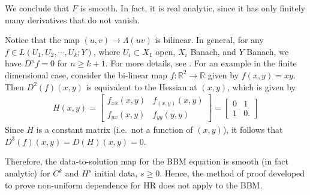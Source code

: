 \documentclass[12pt,reqno]{amsart}
\numberwithin{equation}{section}  %
\newcommand{\rr}{\mathbb{R}}
\begin{document}
We conclude that $F$ is smooth. In fact, it is real analytic, since it has only
finitely many derivatives that do not vanish. 
%
%
\begin{framed}
    Notice that the map $(u, v) \to \Lambda (uv)$ is bilinear. In general, for
    any $f \in L(U_{1}, U_{2}, \cdots, U_{k}; Y)$, where $U_{i} \subset X_{1}$
    open, $X_{i}$ Banach, and $Y$ Banach, we have $D^{n}f = 0$ for $n \ge k+1$.
    For more details, see \cite{Dieudonne_1969_Foundations-of-}. For an 
    example in the finite dimensional case, consider the bi-linear map $f: \rr^{2} \to \rr$ given by $f(x, y) = xy$. Then $D^{2}(f)(x,y)$ is equivalent to the Hessian at $(x,y)$, which is given by
    \begin{equation*}
    \begin{split}
   H(x,y) = 
   \begin{bmatrix}
       f_{xx}(x,y) & f_{(x,y)}(x,y)
       \\
       f_{yx}(x,y) & f_{yy}(y,y)
   \end{bmatrix}
   = 
   \begin{bmatrix}
     0 & 1 
       \\
     1 & 0. 
   \end{bmatrix}
   \end{split}
   \end{equation*}
   Since $H$ is a constant matrix (i.e.\ not a function of $(x,y)$), it follows
   that $D^{3}(f)(x,y) = D(H)(x,y) = 0$. 
\end{framed}
%
Therefore, the data-to-solution map for the BBM equation is smooth (in fact
analytic) for $C^{k}$ and $H^{s}$ initial data, $s \ge 0$. Hence, the method of
proof developed to prove
non-uniform dependence for HR does not apply to the BBM.
\nocite{Dieudonne_1969_Foundations-of-}
\nocite{Jost-1998-Postmodern-analysis}
\nocite{Yosida:1980fk}
        
        
\end{document}
